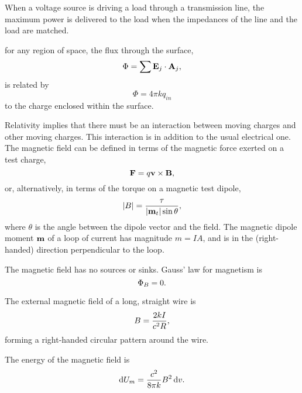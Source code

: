 	When a voltage source is driving a load through a transmission line, the maximum
	power is delivered to the load when the impedances of the line and the load
	are matched.
	
	for any region of space, the flux through the surface,
	\begin{equation*}
		\Phi = \sum \mathbf{E}_j\cdot\mathbf{A}_j,
	\end{equation*}
	is related by
	\begin{equation*}
		\Phi = 4\pi kq_{in}
	\end{equation*}
	to the charge enclosed within the surface.

	Relativity implies that there must be an interaction between
	moving charges and other moving charges. This  interaction
	is in addition to the usual electrical one.
	The magnetic field can be defined in terms of the magnetic force
	exerted on a test charge,
	\begin{equation*}
		\mathbf{F} = q\mathbf{v}\times\mathbf{B},
	\end{equation*}
	or, alternatively, in terms of the torque on a magnetic test dipole,
	\begin{equation*}
		|B| = \frac{\tau}{|\mathbf{m}_{t}|\sin\theta},
	\end{equation*}
	where $\theta$ is the angle between the dipole vector and the field.	
	The magnetic dipole moment $\mathbf{m}$ of a loop of current has magnitude
	$m=IA$, and is in the (right-handed) direction perpendicular to the loop.

	The magnetic field has no sources or sinks. Gauss' law for
	magnetism is
	\begin{equation*}
		\Phi_B = 0.
	\end{equation*}
	
	The external magnetic field of a long, straight wire is
	\begin{equation*}
		B	= \frac{2kI}{c^2R},
	\end{equation*}
	forming a right-handed circular pattern around the wire.
	
	The energy of the magnetic field is
	\begin{equation*}
		\operatorname{d\!} U_m	= 		\frac{c^2}{8\pi k}B^2 \operatorname{d\!} v.
	\end{equation*}

